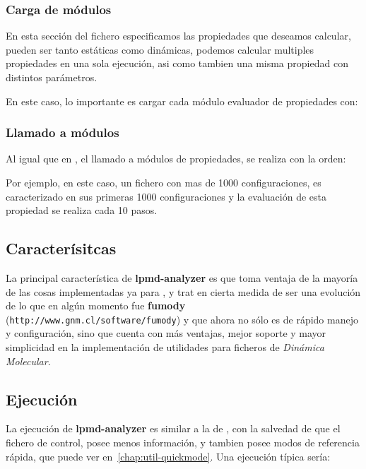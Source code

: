 \subsubsection{Carga de m\'odulos}
En esta secci\'on del fichero especificamos las propiedades que deseamos calcular, pueden ser tanto est\'aticas como din\'amicas, podemos calcular multiples propiedades en una sola ejecuci\'on, asi como tambien una misma propiedad con distintos par\'ametros.

En este caso, lo importante es cargar cada m\'odulo evaluador de propiedades con:

\subsubsection{Llamado a m\'odulos}
Al igual que en {\lpmd}, el llamado a m\'odulos de propiedades, se realiza con la orden:


Por ejemplo, en este caso, un fichero con mas de 1000 configuraciones, es caracterizado en sus primeras 1000 configuraciones y la evaluaci\'on de esta propiedad se realiza cada 10 pasos.

\subsection{Caracter\'isitcas}

La principal caracter\'istica de \textbf{lpmd-analyzer} es que toma ventaja de la mayor\'ia de las cosas implementadas ya para {\lpmd}, y trat en cierta medida de ser una evoluci\'on de lo que en alg\'un momento fue \textbf{fumody} (\texttt{http://www.gnm.cl/software/fumody}) y que ahora no s\'olo es de r\'apido manejo y configuraci\'on, sino que cuenta con m\'as ventajas, mejor soporte y mayor simplicidad en la implementaci\'on de utilidades para ficheros de \textit{Din\'amica Molecular}.

\subsection{Ejecuci\'on}

La ejecuci\'on de \textbf{lpmd-analyzer} es similar a la de {\lpmd}, con la salvedad de que el fichero de control, posee menos informaci\'on, y tambien posee modos de referencia r\'apida, que puede ver en~\ref{chap:util-quickmode}. Una ejecuci\'on t\'ipica ser\'ia:

